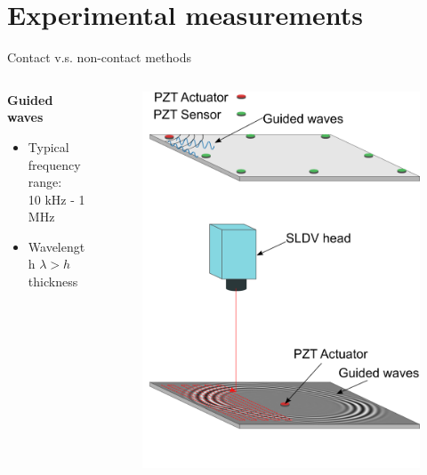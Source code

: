 \documentclass[10pt,aspectratio=169,dvipsnames]{beamer} %
\begin{document}
	\section*{Experimental measurements}
	\begin{frame}{Contact v.s. non-contact methods} 
		\begin{columns}[T]
			\begin{column}[c]{0.38\textwidth}
				\textbf{Guided waves}	
				\begin{itemize}
					\item Typical frequency range: \\ 10 kHz - 1 MHz
					\item Wavelength \(\lambda > h\) thickness 
				\end{itemize}
			\end{column}
			\begin{column}[c]{0.6\textwidth}				
				\begin{figure}
					\includegraphics[height=0.8\textheight]{local_ultrasonic.png}

\end{figure}
\end{column}
\end{columns}
\end{frame}
\end{document}
